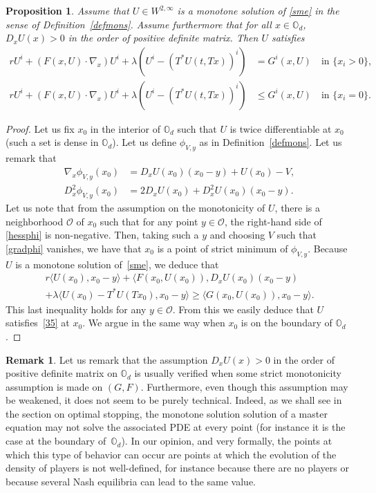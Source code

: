 \documentclass[10pt]{amsart}
\let\mathcal\mathscr
\newtheorem{Prop}{Proposition}[section]
\theoremstyle{definition}
\newtheorem{Rem}{Remark}[section]
\begin{document}
\begin{Prop}\label{consist}
Assume that $U\in W^{2,\infty}$ is a monotone solution of \eqref{sme} in the sense of Definition~\ref{defmons}. Assume furthermore that for all $x \in \mathbb{O}_d$, $D_x U(x) > 0$ in the order of positive definite matrix. Then $U$ satisfies
\begin{equation}\label{35}
\begin{split}
r U^i+(F(x,U)\cdot \nabla_x)U^i+\lambda \left(U^i-(T^*U(t,Tx))^i\right)&= G^i(x,U) \quad\text{in } \{x_i > 0\},\\
r U^i+(F(x,U)\cdot \nabla_x)U^i+\lambda \left(U^i-(T^*U(t,Tx))^i\right)&\leq G^i(x,U) \quad\text{in } \{x_i =0\}.
\end{split}
\end{equation}
\end{Prop}
\begin{proof}
Let us fix $x_0$ in the interior of $\mathbb{O}_d$ such that $U$ is twice differentiable at $x_0$ (such a set is dense in $\mathbb{O}_d$). Let us define $\phi_{V,y}$ as in Definition~\ref{defmons}. Let us remark that
\begin{align}\label{gradphi}
\nabla_x \phi_{V,y}(x_0) &= D_x U(x_0) (x_0-y)+U(x_0)-V,\\\label{hessphi}
D^2_x \phi_{V,y}(x_0) &= 2 D_x U(x_0)+D^2_xU(x_0)(x_0-y).
\end{align}
Let us note that from the assumption on the monotonicity of $U$, there is a neighborhood $\mathcal{O}$ of $x_0$ such that for any point $y \in \mathcal{O}$, the right-hand side of \eqref{hessphi} is non-negative. Then, taking such a $y$ and choosing $V$ such that \eqref{gradphi} vanishes, we have that $x_0$ is a point of strict minimum of $\phi_{V,y}$. Because $U$ is a monotone solution of~\eqref{sme}, we deduce that
\begin{multline*}
r\langle U(x_0), x_0-y\rangle+\langle F(x_0,U(x_0)), D_x U(x_0)(x_0-y)\\
+ \lambda \langle U(x_0)-T^*U(Tx_0),x_0-y\rangle \geq \langle G(x_0, U(x_0)), x_0-y\rangle.
\end{multline*}
This last inequality holds for any $y \in \mathcal{O}$. From this we easily deduce that $U$ satisfies~\eqref{35} at $x_0$. We argue in the same way when $x_0$ is on the boundary of $\mathbb{O}_d$.
\end{proof}
\begin{Rem}
Let us remark that the assumption $D_x U(x) > 0$ in the order of positive definite matrix on $\mathbb{O}_d$ is usually verified when some strict monotonicity assumption is made on $(G,F)$. Furthermore, even though this assumption may be weakened, it does not seem to be purely technical. Indeed, as we shall see in the section on optimal stopping, the monotone solution solution of a master equation may not solve the associated PDE at every point (for instance it is the case at the boundary of~$\mathbb{O}_d$). In our opinion, and very formally, the points at which this type of behavior can occur are points at which the evolution of the density of players is not well-defined, for instance because there are no players or because several Nash equilibria can lead to the same value.
\end{Rem}
\end{document}
